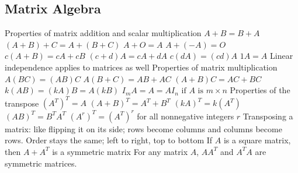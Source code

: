 \documentclass{article}
\begin{document}
   \subsection{Matrix Algebra}
   \begin{outline}
        \1 Properties of matrix addition and scalar multiplication
            \2 \(A+B=B+A\)
            \2 \((A+B)+C=A+(B+C)\)
            \2 \(A+O=A\)
            \2 \(A+(-A)=O\)
            \2 \(c(A+B)=cA+cB\)
            \2 \((c+d)A=cA+dA\)
            \2 \(c(dA)=(cd)A\)
            \2 \(1A=A\)
        \1 Linear independence applies to matrices as well
        \1 Properties of matrix multiplication 
            \2 \(A(BC)=(AB)C\)
            \2 \(A(B+C)=AB+AC\)
            \2 \((A+B)C=AC+BC\)
            \2 \(k(AB)=(kA)B=A(kB)\)
            \2 \(I_mA=A=AI_n\text{ if }A\text{ is }m\times n\)
        \1 Properties of the transpose
            \2 \((A^T)^T=A\)
            \2 \((A+B)^T=A^T+B^T\)
            \2 \((kA)^T=k(A^T)\)
            \2 \((AB)^T=B^TA^T\)
            \2 \((A^r)^T=(A^T)^r\) for all nonnegative integers $r$
        \1 Transposing a matrix: like flipping it on its side; rows become columns and columns become rows. Order stays the same; left to right, top to bottom
        \1 If \(A\) is a square matrix, then \(A+A^T\) is a symmetric matrix 
        \1 For any matrix $A$, \(AA^T\) and \(A^TA\) are symmetric matrices. 
   \end{outline}
\end{document}

